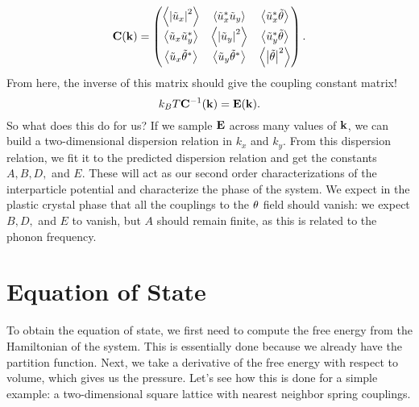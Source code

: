 \documentclass[12pt]{article}
\begin{document}
\[ \mathbf{C}(\mathbf{k}) = \left(\begin{matrix}\left \langle \left | \tilde u_x \right |^2 \right \rangle & \left \langle \tilde u_x^* \tilde u_y \right \rangle & \left \langle \tilde u_x^* \tilde {\theta} \right \rangle \\ \left \langle \tilde u_x \tilde u_y^* \right \rangle & \left \langle \left | \tilde u_y \right |^2 \right \rangle & \left \langle \tilde u_y^* \tilde {\theta} \right \rangle \\ \left \langle \tilde u_x \tilde {\theta}^* \right \rangle & \left \langle \tilde u_y \tilde {\theta}^* \right \rangle & \left \langle \left | \tilde {\theta} \right |^2 \right \rangle \end{matrix}\right).\]
From here, the inverse of this matrix should give the coupling constant matrix!
\[ k_BT \mathbf{C}^{-1}(\mathbf{k}) = \mathbf{E}(\mathbf{k}).\]
So what does this do for us? If we sample $\mathbf{E}$ across many values of $\mathbf{k}$, we can build a two-dimensional dispersion relation in $k_x$ and $k_y$. From this dispersion relation, we fit it to the predicted dispersion relation and get the constants $A,B,D,$ and $E$. These will act as our second order characterizations of the interparticle potential and characterize the phase of the system. We expect in the plastic crystal phase that all the couplings to the $\theta$ field should vanish: we expect $B,D,$ and $E$ to vanish, but $A$ should remain finite, as this is related to the phonon frequency.


\section{Equation of State}

To obtain the equation of state, we first need to compute the free energy from the Hamiltonian of the system. This is essentially done because we already have the partition function. Next, we take a derivative of the free energy with respect to volume, which gives us the pressure. Let's see how this is done for a simple example: a two-dimensional square lattice with nearest neighbor spring couplings.
\end{document}
